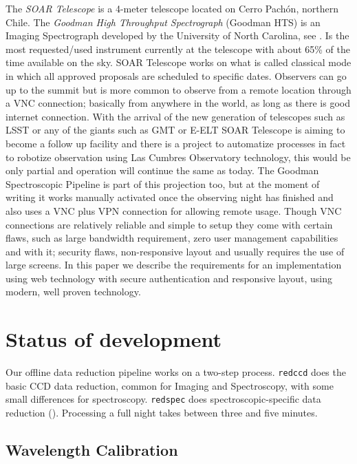 \documentclass[11pt,twoside]{article}
\begin{document}
The \emph{SOAR Telescope} is a 4-meter telescope located on Cerro Pach\'on, northern Chile. The \emph{Goodman High Throughput Spectrograph} (Goodman HTS) is an Imaging Spectrograph developed by the University of North Carolina, see \citet{2004SPIE.5492..331C}. Is the most requested/used instrument currently at the telescope with about 65\% of the time available on the sky. SOAR Telescope works on what is called classical mode in which all approved proposals are scheduled to specific dates. Observers can go up to the summit but is more common to observe from a remote location through a VNC connection; basically from anywhere in the world, as long as there is good internet connection. With the arrival of the new generation of telescopes such as LSST or any of the giants such as GMT or E-ELT SOAR Telescope is aiming to become a follow up facility and there is a project to automatize processes in fact to robotize observation using Las Cumbres Observatory technology, this would be only partial and operation will continue the same as today. The Goodman Spectroscopic Pipeline is part of this projection too, but at the moment of writing it works manually activated once the observing night has finished and also uses a VNC plus VPN connection for allowing remote usage. Though VNC connections are relatively reliable and simple to setup they come with certain flaws, such as large bandwidth requirement, zero user management capabilities and with it; security flaws, non-responsive layout and usually requires the use of large screens. In this paper we describe the requirements for an implementation using web technology with secure authentication and responsive layout, using modern, well proven technology.

\section{Status of development}


Our offline data reduction pipeline works on a two-step process. \verb=redccd= does the basic CCD data reduction, common for Imaging and Spectroscopy, with some small differences for spectroscopy. \verb=redspec= does spectroscopic-specific data reduction (\citet{2013pss2.book...35M}). Processing a full night takes between three and five minutes.

\subsection{Wavelength Calibration}
\end{document}
